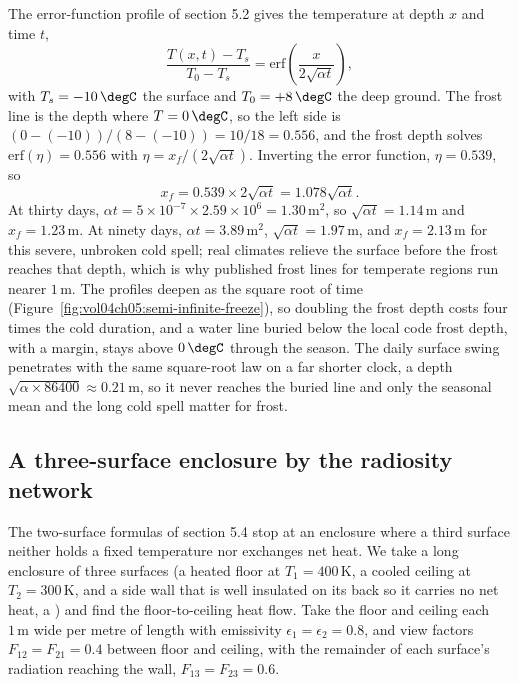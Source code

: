 The error-function profile of section 5.2 gives the temperature at depth
$x$ and time $t$,
\[
\frac{T(x,t) - T_s}{T_0 - T_s} = \text{erf}\!\left(\frac{x}{2\sqrt{\alpha
t}}\right),
\]
with $T_s = -10\,\degC$ the surface and $T_0 = +8\,\degC$ the deep ground.
The frost line is the depth where $T = 0\,\degC$, so the left side is
$(0 - (-10))/(8 - (-10)) = 10/18 = 0.556$, and the frost depth solves
$\text{erf}(\eta) = 0.556$ with $\eta = x_f/(2\sqrt{\alpha t})$. Inverting
the error function, $\eta = 0.539$, so
\[
x_f = 0.539 \times 2\sqrt{\alpha t} = 1.078\sqrt{\alpha t}.
\]
At thirty days, $\alpha t = 5\times10^{-7} \times 2.59\times10^6 = 1.30\,
\text{m}^2$, so $\sqrt{\alpha t} = 1.14\,\text{m}$ and $x_f = 1.23\,
\text{m}$. At ninety days, $\alpha t = 3.89\,\text{m}^2$, $\sqrt{\alpha t}
= 1.97\,\text{m}$, and $x_f = 2.13\,\text{m}$ for this severe, unbroken
cold spell; real climates relieve the surface before the frost reaches
that depth, which is why published frost lines for temperate regions run
nearer $1\,\text{m}$. The profiles deepen as the square root of time
(Figure~\ref{fig:vol04ch05:semi-infinite-freeze}), so doubling the frost
depth costs four times the cold duration, and a water line buried below
the local code frost depth, with a margin, stays above $0\,\degC$ through
the season. The daily surface swing penetrates with the same square-root
law on a far shorter clock, a depth $\sqrt{\alpha \times 86400} \approx
0.21\,\text{m}$, so it never reaches the buried line and only the seasonal
mean and the long cold spell matter for frost.



\subsection{A three-surface enclosure by the radiosity network}

The two-surface formulas of section 5.4 stop at an enclosure where a
third surface neither holds a fixed temperature nor exchanges net heat.
We take a long enclosure of three surfaces (a heated floor at $T_1 =
400\,\si{\kelvin}$, a cooled ceiling at $T_2 = 300\,\si{\kelvin}$, and a
side wall that is well insulated on its back so it carries no net heat,
a ) and find the floor-to-ceiling heat flow.
Take the floor and ceiling each $1\,\text{m}$ wide per metre of length
with emissivity $\epsilon_1 = \epsilon_2 = 0.8$, and view factors
$F_{12} = F_{21} = 0.4$ between floor and ceiling, with the remainder of
each surface's radiation reaching the wall, $F_{13} = F_{23} = 0.6$.

